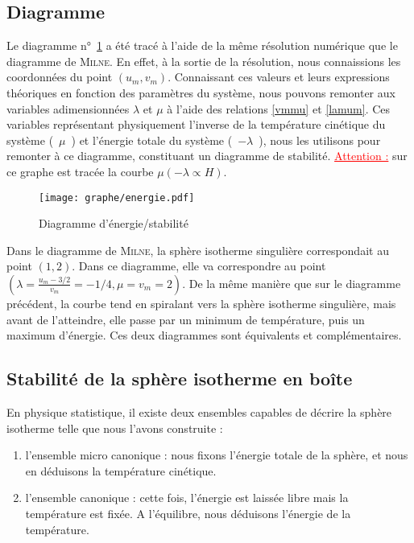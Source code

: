 \subsection{Diagramme}
	Le diagramme n°~\ref{Ener} a été tracé à l'aide de la même résolution numérique que le diagramme de \textsc{Milne}.
	En effet, à la sortie de la résolution, nous connaissions les coordonnées du point $\left(u_m,v_m\right)$.
	Connaissant ces valeurs et leurs expressions théoriques en fonction des paramètres du système,
	nous pouvons remonter aux variables adimensionnées $\lambda$ et $\mu$ à l'aide des relations \ref{vmmu} et \ref{lamum}.
	Ces variables représentant physiquement l'inverse de la température cinétique du système (~$\mu$~) et l'énergie totale du système (~$-\lambda$~),
	nous les utilisons pour remonter à ce diagramme, constituant un diagramme de stabilité.
	\textcolor{red}{\underline{Attention :}} sur ce graphe est tracée la courbe $\mu\left(-\lambda\varpropto H\right)$.
	\begin{figure}[h!]
		\centering \texttt{[image: graphe/energie.pdf]}
		\caption{Diagramme d'énergie/stabilité}
		\label{Ener}
	\end{figure}

	Dans le diagramme de \textsc{Milne}, la sphère isotherme singulière correspondait au point $\left(1,2\right)$.
	Dans ce diagramme, elle va correspondre au point $\left(\lambda = \frac{u_m - 3/2}{v_m} = -1/4, \mu = v_m = 2\right)$.
	De la même manière que sur le diagramme précédent, la courbe tend en spiralant vers la sphère isotherme singulière, mais avant de l'atteindre,
	elle passe par un minimum de température, puis un maximum d'énergie. Ces deux diagrammes sont équivalents et complémentaires.

\subsection{Stabilité de la sphère isotherme en boîte}
	En physique statistique, il existe deux ensembles capables de décrire la sphère isotherme telle que nous l'avons construite :
	\begin{enumerate}
		\item l'ensemble micro canonique : nous fixons l'énergie totale de la sphère, et nous en déduisons la température cinétique.
		\item l'ensemble canonique : cette fois, l'énergie est laissée libre mais la
			température est fixée.
			A l'équilibre, nous déduisons l'énergie de la température.
	\end{enumerate}

